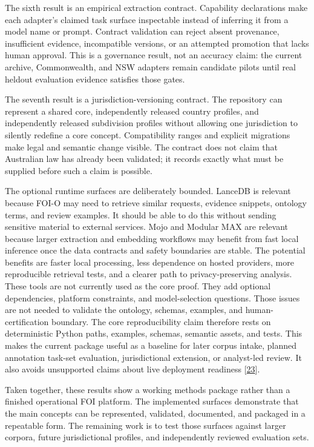 \documentclass[
]{article}
\begin{document}
The sixth result is an empirical extraction contract. Capability
declarations make each adapter's claimed task surface inspectable
instead of inferring it from a model name or prompt. Contract validation
can reject absent provenance, insufficient evidence, incompatible
versions, or an attempted promotion that lacks human approval. This is a
governance result, not an accuracy claim: the current archive,
Commonwealth, and NSW adapters remain candidate pilots until real
heldout evaluation evidence satisfies those gates.

The seventh result is a jurisdiction-versioning contract. The repository
can represent a shared core, independently released country profiles,
and independently released subdivision profiles without allowing one
jurisdiction to silently redefine a core concept. Compatibility ranges
and explicit migrations make legal and semantic change visible. The
contract does not claim that Australian law has already been validated;
it records exactly what must be supplied before such a claim is
possible.

The optional runtime surfaces are deliberately bounded. LanceDB is
relevant because FOI-O may need to retrieve similar requests, evidence
snippets, ontology terms, and review examples. It should be able to do
this without sending sensitive material to external services. Mojo and
Modular MAX are relevant because larger extraction and embedding
workflows may benefit from fast local inference once the data contracts
and safety boundaries are stable. The potential benefits are faster
local processing, less dependence on hosted providers, more reproducible
retrieval tests, and a clearer path to privacy-preserving analysis.
These tools are not currently used as the core proof. They add optional
dependencies, platform constraints, and model-selection questions. Those
issues are not needed to validate the ontology, schemas, examples, and
human-certification boundary. The core reproducibility claim therefore
rests on deterministic Python paths, examples, schemas, semantic assets,
and tests. This makes the current package useful as a baseline for later
corpus intake, planned annotation task-set evaluation, jurisdictional
extension, or analyst-led review. It also avoids unsupported claims
about live deployment readiness {[}\hyperlink{ref-23}{23}{]}.

Taken together, these results show a working methods package rather than
a finished operational FOI platform. The implemented surfaces
demonstrate that the main concepts can be represented, validated,
documented, and packaged in a repeatable form. The remaining work is to
test those surfaces against larger corpora, future jurisdictional
profiles, and independently reviewed evaluation sets.
\end{document}
